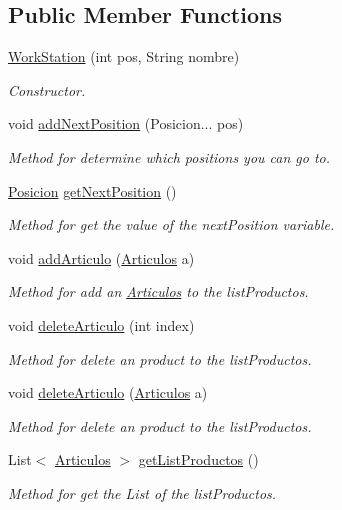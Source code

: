 \subsection*{Public Member Functions}
\begin{DoxyCompactItemize}
\item 
\mbox{\hyperlink{classmodelo_1_1_work_station_a04df345e4feea6715d7aafda01ed54cc}{Work\+Station}} (int pos, String nombre)
\begin{DoxyCompactList}\small\item\em Constructor. \end{DoxyCompactList}\item 
void \mbox{\hyperlink{classmodelo_1_1_work_station_ab1d63cc56798b17b893f8bb70c1445ff}{add\+Next\+Position}} (Posicion... pos)
\begin{DoxyCompactList}\small\item\em Method for determine which positions you can go to. \end{DoxyCompactList}\item 
\mbox{\hyperlink{classmodelo_1_1_posicion}{Posicion}} \mbox{\hyperlink{classmodelo_1_1_work_station_a1a51d9eb9af6508169f216cbcfb3c605}{get\+Next\+Position}} ()
\begin{DoxyCompactList}\small\item\em Method for get the value of the next\+Position variable. \end{DoxyCompactList}\item 
void \mbox{\hyperlink{classmodelo_1_1_work_station_a1d36e29aba2a6d03a918eb87d724c839}{add\+Articulo}} (\mbox{\hyperlink{classmodelo_1_1_articulos}{Articulos}} a)
\begin{DoxyCompactList}\small\item\em Method for add an \mbox{\hyperlink{classmodelo_1_1_articulos}{Articulos}} to the list\+Productos. \end{DoxyCompactList}\item 
void \mbox{\hyperlink{classmodelo_1_1_work_station_a32b6c88273b4642b6137f9b9f637650e}{delete\+Articulo}} (int index)
\begin{DoxyCompactList}\small\item\em Method for delete an product to the list\+Productos. \end{DoxyCompactList}\item 
void \mbox{\hyperlink{classmodelo_1_1_work_station_a2dad4fede50b2fc15db08f5914990d74}{delete\+Articulo}} (\mbox{\hyperlink{classmodelo_1_1_articulos}{Articulos}} a)
\begin{DoxyCompactList}\small\item\em Method for delete an product to the list\+Productos. \end{DoxyCompactList}\item 
List$<$ \mbox{\hyperlink{classmodelo_1_1_articulos}{Articulos}} $>$ \mbox{\hyperlink{classmodelo_1_1_work_station_a6b1f1a4392c9e5e31bf6168b0cc33200}{get\+List\+Productos}} ()
\begin{DoxyCompactList}\small\item\em Method for get the List of the list\+Productos. \end{DoxyCompactList}\end{DoxyCompactItemize}


